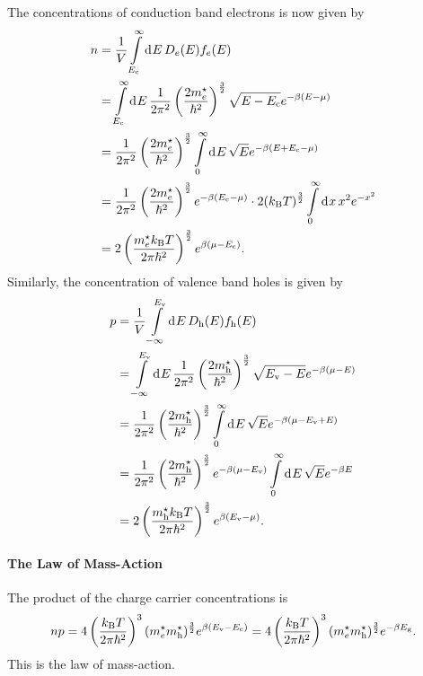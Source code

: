 The concentrations of conduction band electrons is now given by
\begin{align*}
	n &= \frac{1}{V}\int\limits_{E_{\text{c}}}^{\infty}\dd[]{E}D_{e}(E)f_{e}(E) \\
	  &= \int\limits_{E_{\text{c}}}^{\infty}\dd[]{E}\frac{1}{2\pi^{2}}\left(\frac{2m^{\star}_{e}}{\hbar^{2}}\right)^{\frac{3}{2}}\sqrt{E - E_{\text{c}}}e^{-\beta(E - \mu)} \\
	  &= \frac{1}{2\pi^{2}}\left(\frac{2m^{\star}_{e}}{\hbar^{2}}\right)^{\frac{3}{2}}\int\limits_{0}^{\infty}\dd[]{E}\sqrt{E}e^{-\beta(E + E_{\text{c}} - \mu)} \\
	  &= \frac{1}{2\pi^{2}}\left(\frac{2m^{\star}_{e}}{\hbar^{2}}\right)^{\frac{3}{2}}e^{-\beta(E_{\text{c}} - \mu)}\cdot 2(k_{\text{B}} T)^{\frac{3}{2}}\int\limits_{0}^{\infty}\dd[]{x}x^{2}e^{-x^{2}} \\
	  &= 2\left(\frac{m^{\star}_{e}k_{\text{B}} T}{2\pi\hbar^{2}}\right)^{\frac{3}{2}}e^{\beta(\mu - E_{\text{c}})}.
\end{align*}
Similarly, the concentration of valence band holes is given by
\begin{align*}
	p &= \frac{1}{V}\int\limits_{-\infty}^{E_{\text{v}}}\dd[]{E}D_{\text{h}}(E)f_{\text{h}}(E) \\
	  &= \int\limits_{-\infty}^{E_{\text{v}}}\dd[]{E}\frac{1}{2\pi^{2}}\left(\frac{2m^{\star}_{\text{h}}}{\hbar^{2}}\right)^{\frac{3}{2}}\sqrt{E_{\text{v}} - E}e^{-\beta(\mu - E)} \\
	  &= \frac{1}{2\pi^{2}}\left(\frac{2m^{\star}_{\text{h}}}{\hbar^{2}}\right)^{\frac{3}{2}}\int\limits_{0}^{\infty}\dd[]{E}\sqrt{E}e^{-\beta(\mu - E_{\text{v}} + E)} \\
	  &= \frac{1}{2\pi^{2}}\left(\frac{2m^{\star}_{\text{h}}}{\hbar^{2}}\right)^{\frac{3}{2}}e^{-\beta(\mu - E_{\text{v}})}\int\limits_{0}^{\infty}\dd[]{E}\sqrt{E}e^{-\beta E} \\
	  &= 2\left(\frac{m^{\star}_{\text{h}}k_{\text{B}} T}{2\pi\hbar^{2}}\right)^{\frac{3}{2}}e^{\beta(E_{\text{v}} - \mu)}.
\end{align*}

\paragraph{The Law of Mass-Action}
The product of the charge carrier concentrations is
\begin{align*}
	np = 4\left(\frac{k_{\text{B}} T}{2\pi\hbar^{2}}\right)^{3}(m^{\star}_{e}m^{\star}_{\text{h}})^{\frac{3}{2}}e^{\beta(E_{\text{v}} - E_{\text{c}})} = 4\left(\frac{k_{\text{B}} T}{2\pi\hbar^{2}}\right)^{3}(m^{\star}_{e}m^{\star}_{\text{h}})^{\frac{3}{2}}e^{-\beta E_{\text{g}}}.
\end{align*}
This is the law of mass-action.

